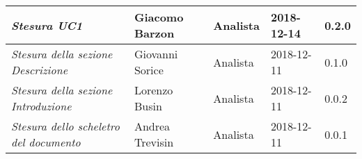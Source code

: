 \begin{table}[H]
\begin{tabular}{p{4cm}|C{3cm}|C{3cm}|R{2.5cm}|R{2cm}}
		\emph{Stesura UC1} & Giacomo Barzon & Analista & 2018-12-14 & 0.2.0 \\
		\hline
		
		\emph{Stesura della sezione Descrizione } & Giovanni Sorice & Analista & 2018-12-11 & 0.1.0 \\
		\hline
		
		\emph{Stesura della sezione Introduzione } & Lorenzo Busin & Analista & 2018-12-11 & 0.0.2 \\
		\hline
		
		\emph{Stesura dello scheletro del documento} & Andrea Trevisin & Analista & 2018-12-11 & 0.0.1 \\
		
	\end{tabular}
	
\end{table}


\clearpage